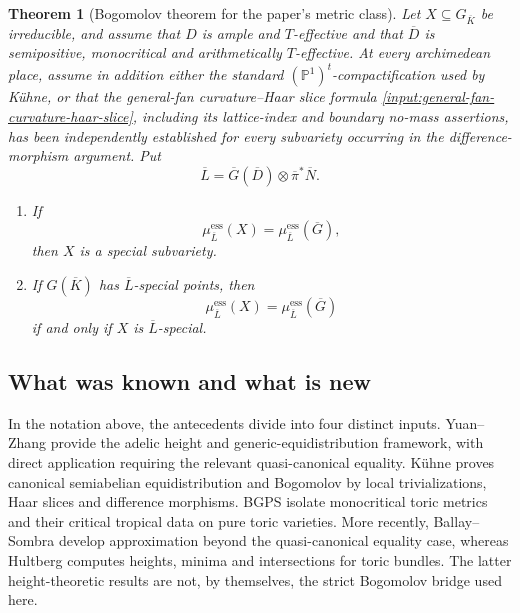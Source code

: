 \documentclass[10pt,a4paper]{amsart}
\theoremstyle{plain}
\theoremstyle{plain}
\newtheorem{thm}{Theorem}[section] \newtheorem{cor}[thm]{Corollary}
\numberwithin{equation}{section}
\begin{document}
\begin{thm}[Bogomolov theorem for the paper's metric class]
	\label{thm:intro-bogomolov}
	Let \(X\subseteq G_{\overline K}\) be irreducible, and assume that \(D\) is ample
	and \(T\)-effective and that \(\overline D\) is semipositive, monocritical and
	arithmetically \(T\)-effective.  At every archimedean place, assume in addition
	either the standard \((\mathbb P^1)^t\)-compactification used by K\"uhne, or
	that the general-fan curvature--Haar slice formula
	\ref{input:general-fan-curvature-haar-slice}, including its lattice-index and
	boundary no-mass assertions, has been independently established for every
	subvariety occurring in the difference-morphism argument.  Put
	\[
	\overline L
	=\overline G(\overline D)\otimes\overline\pi^*\overline N .
	\]
	\begin{enumerate}[label=\textup{(\arabic*)},leftmargin=2em]
		\item If
		\[
		\mu^{\mathrm{ess}}_{\overline{L}}(X)
		=
		\mu^{\mathrm{ess}}_{\overline{L}}(\overline{G}),
		\]
		then \(X\) is a special subvariety.
		\item If \(G(\overline K)\) has \(\overline L\)-special points, then
		\[
		\mu^{\mathrm{ess}}_{\overline{L}}(X)
		=
		\mu^{\mathrm{ess}}_{\overline{L}}(\overline{G})
		\]
		if and only if \(X\) is \(\overline L\)-special.
	\end{enumerate}
\end{thm}

\subsection*{What was known and what is new}

In the notation above, the antecedents divide into four distinct inputs.
Yuan--Zhang \cite{YZ} provide the adelic height and generic-equidistribution
framework, with direct application requiring the relevant quasi-canonical
equality.  K\"uhne \cite{Ku1} proves canonical semiabelian equidistribution
and Bogomolov by local trivializations, Haar slices and difference morphisms.
BGPS \cite{BGPS19} isolate monocritical toric metrics and their critical
tropical data on pure toric varieties.  More recently, Ballay--Sombra
\cite{BS24} develop approximation beyond the quasi-canonical equality case,
whereas Hultberg \cite{Hul24} computes heights, minima and intersections for
toric bundles.  The latter height-theoretic results are not, by themselves,
the strict Bogomolov bridge used here.
\end{document}
